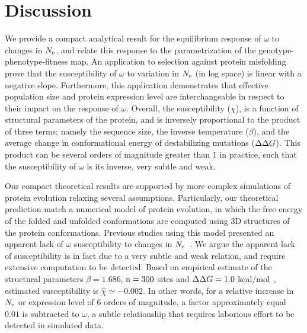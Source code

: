 \section{Discussion}

We provide a compact analytical result for the equilibrium response of $\omega$ to changes in $N_{\mathrm{e}}$, and relate this response to the parametrization of the genotype-phenotype-fitness map.
An application to selection against protein misfolding prove that the susceptibility of $\omega$ to variation in $N_{\mathrm{e}}$ (in log space) is linear with a negative slope.
Furthermore, this application demonstrates that effective population size and protein expression level are interchangeable in respect to their impact on the response of $\omega$.
Overall, the susceptibility ($\chi$), is a function of structural parameters of the protein, and is inversely proportional to the product of three terms;
namely the sequence size, the inverse temperature ($\beta$), and the average change in conformational energy of destabilizing mutations ($\Delta \Delta G$).
This product can be several orders of magnitude greater than $1$ in practice, such that the susceptibility of $\omega$ is its inverse, very subtle and weak.


Our compact theoretical results are supported by more complex simulations of protein evolution relaxing several assumptions.
Particularly, our theoretical prediction match a numerical model of protein evolution, in which the free energy of the folded and unfolded conformations are computed using $3$D structures of the protein conformations.
Previous studies using this model presented an apparent lack of $\omega$ susceptibility to changes in $N_{\mathrm{e}}$~\citep{Goldstein2013}.
We argue the apparent lack of susceptibility is in fact due to a very subtle and weak relation, and require extensive computation to be detected.
Based on empirical estimate of the structural parameters $\beta = 1.686$, $\text{n}=300$ sites and $\Delta \Delta G = 1.0$ kcal/mol~\citep{Zeldovich2007}, estimated susceptibility is $\hat{\chi} \simeq -0.002$.
In other words, for a relative increase in $N_{\mathrm{e}}$ or expression level of $6$ orders of magnitude, a factor approximately equal $0.01$ is subtracted to $\omega$, a subtle relationship that requires laborious effort to be detected in simulated data.

